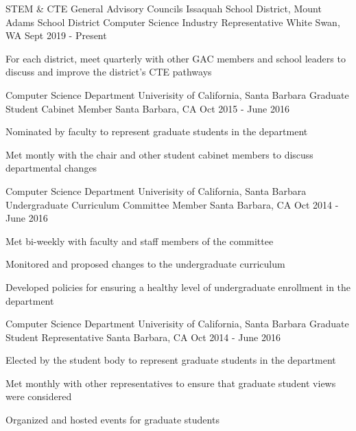 \begin{cventries}

\cventry
    {STEM \& CTE General Advisory Councils \newline Issaquah School District, Mount Adams School District}
    {Computer Science Industry Representative}
    {White Swan, WA}
    {Sept 2019 - Present}
    {
      \begin{cvitems}
	\item{For each district, meet quarterly with other GAC members and school leaders to discuss and improve the district's CTE pathways}
      \end{cvitems}
    }

\cventry
    {Computer Science Department \newline Univerisity of California, Santa Barbara}
    {Graduate Student Cabinet Member}
    {Santa Barbara, CA}
    {Oct 2015 - June 2016}
    {
      \begin{cvitems}
	\item{Nominated by faculty to represent graduate students in the department}
        \item {Met montly with the chair and other student cabinet members to discuss departmental changes}
      \end{cvitems}
    }

  \cventry
    {Computer Science Department \newline Univerisity of California, Santa Barbara}
    {Undergraduate Curriculum Committee Member}
    {Santa Barbara, CA}
    {Oct 2014 - June 2016}
    {
      \begin{cvitems}
	\item{Met bi-weekly with faculty and staff members of the committee}
        \item {Monitored and proposed changes to the undergraduate curriculum}
        \item {Developed policies for ensuring a healthy level of undergraduate enrollment in the department}
      \end{cvitems}
    }

\cventry
    {Computer Science Department \newline Univerisity of California, Santa Barbara}
    {Graduate Student Representative}
    {Santa Barbara, CA}
    {Oct 2014 - June 2016}
    {
      \begin{cvitems}
	\item{Elected by the student body to represent graduate students in the department}
        \item {Met monthly with other representatives to ensure that graduate student views were considered}
        \item {Organized and hosted events for graduate students}
      \end{cvitems}
    }


\end{cventries}
